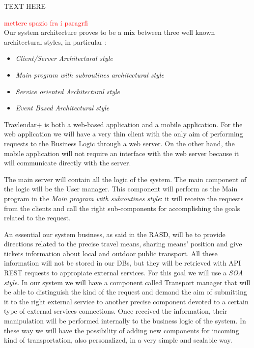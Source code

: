 
TEXT HERE


\textcolor{red}{\huge mettere spazio fra i paragrfi}\\
Our system architecture proves to be a mix between three well known architectural styles, in particular : 

\begin{itemize}
\setlength{\leftskip}{0.5cm}
\item \emph{Client/Server Architectural style}
\item \emph{Main program with subroutines architectural style}
\item \emph{Service oriented Architectural style}
\item \emph{Event Based Architectural style}
\end{itemize}

Travlendar+ is both a web-based application and a mobile application. For the web application we will have a very thin client with the only aim of performing requests to the Business Logic through a web server.
On the other hand, the mobile application will not require an interface with the web server because it will communicate directly with the server.

The main server will contain all the logic of the system. The main component of the logic will be the User manager. This component will perform as the Main program in the \emph{Main program with subroutines style}: it will receive the requests from the clients and call the right sub-components for accomplishing the goals related to the request.

An essential our system business, as said in the RASD, will be to provide directions related to the precise travel means, sharing means’ position and give tickets information about local and outdoor public transport. All these information will not be stored in our DBs, but they will be retrieved with API REST requests to appropiate external services. For this goal we will use a \emph{SOA style}. 
In our system we will have a component called Transport manager that will be able to distinguish the kind of the request and demand the aim of submitting it to the right external service to another precise component devoted to a certain type of external services connections. Once received the information, their manipulation will be performed internally to the business logic of the system. In these way we will have the possibility of adding new components for incoming kind of transportation, also personalized, in a very simple and scalable way.

